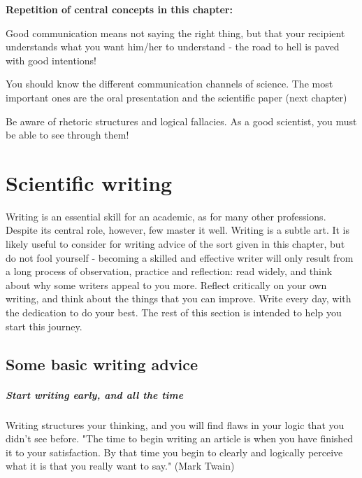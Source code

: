 \documentclass{tufte-book}
\begin{document}
\vspace{1cm}
\begin{mdframed}
    
\textbf{Repetition of central concepts in this chapter:} 

\begin{itemize*}
  \item Good communication means not saying the right thing, but that your recipient understands what you want him/her to understand - the road to hell is paved with good intentions!
  \item You should know the different communication channels of science. The most important ones are the oral presentation and the scientific paper (next chapter)
  \item Be aware of rhetoric structures and logical fallacies. As a good scientist, you must be able to see through them!
\end{itemize*}

\end{mdframed}



\chapter{Scientific writing}

Writing is an essential skill for an academic, as for many other professions.  Despite its central role, however, few master it well. Writing is a subtle art. It is likely useful to consider for writing advice of the sort given in this chapter, but do not fool yourself - becoming a skilled and effective writer will only result from a long process of observation, practice and reflection: read widely, and think about why some writers appeal to you more. Reflect critically on your own writing, and think about the things that you can improve. Write every day, with the dedication to do your best. The rest of this section is intended to help you start this journey. 

\section{Some basic writing advice}

\paragraph{Start writing early, and all the time} Writing structures your thinking, and you will find flaws in your logic that you didn't see before. "The time to begin writing an article is when you have finished it to your satisfaction. By that time you begin to clearly and logically perceive what it is that you really want to say." (Mark Twain)
\end{document}
